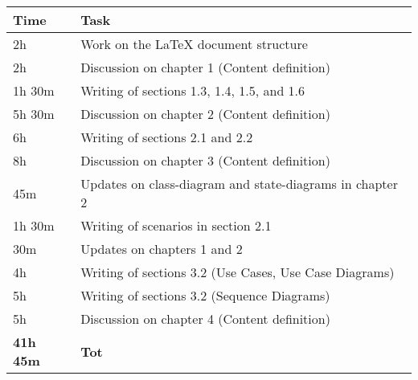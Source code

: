 \begin{center}
    {\renewcommand{\arraystretch}{2}%
    \begin{tabular}{L{2cm}L{12cm}}
        \hline
        \textbf{Time} & \textbf{Task} \\
        \hline
        2h & Work on the LaTeX document structure \\
        \hline
        2h & Discussion on chapter 1 (Content definition) \\
        \hline
        1h 30m& Writing of sections 1.3, 1.4, 1.5, and 1.6 \\
        \hline
        5h 30m & Discussion on chapter 2 (Content definition) \\
        \hline
        6h & Writing of sections 2.1 and 2.2 \\
        \hline
        8h & Discussion on chapter 3 (Content definition) \\
        \hline
        45m & Updates on class-diagram and state-diagrams in chapter 2 \\
        \hline
        1h 30m & Writing of scenarios in section 2.1 \\
        \hline
        30m & Updates on chapters 1 and 2 \\
        \hline
        4h & Writing of sections 3.2 (Use Cases, Use Case Diagrams) \\
        \hline
        5h & Writing of sections 3.2 (Sequence Diagrams) \\
        \hline
        5h & Discussion on chapter 4 (Content definition) \\
        \hline
        \textbf{41h 45m} & \textbf{Tot} \\
    \end{tabular}}
\end{center}